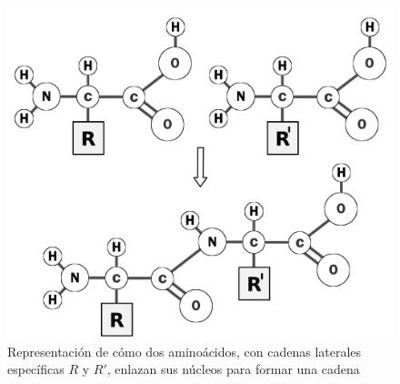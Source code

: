 \documentclass[letterpaper, 12pt]{report}
\begin{document}
\begin{figure}[h!]
    \begin{center}
        \includegraphics[scale=0.5]{images/dipeptido.png}
    \end{center}    
    \caption{Representaci\'on de c\'omo dos aminoácidos, con cadenas laterales espec\'ificas $R$ y $R'$, enlazan sus n\'ucleos para formar una cadena}
    \label{fig1}
\end{figure} 
\end{document}
